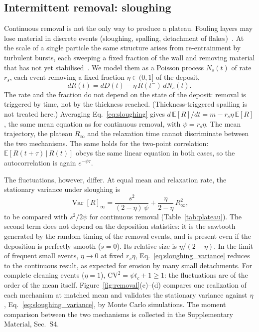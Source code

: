 \documentclass[preprint,12pt]{elsarticle}
\begin{document}
\subsection{Intermittent removal: sloughing}
\label{sec:removal_sloughing}

Continuous removal is not the only way to produce a plateau. Fouling layers
may lose material in discrete events (sloughing, spalling, detachment of
flakes)~\cite{Stewart1993,Bohn2007}. At the scale of a single particle the same
structure arises from re-entrainment by turbulent bursts, each sweeping a fixed
fraction of the wall and removing material that has not yet
stabilised~\cite{Vatistas1988}. We model them as a Poisson process $N_s(t)$ of rate $r_s$, each event
removing a fixed fraction $\eta\in(0,1]$ of the deposit,
\begin{equation}
  dR(t)=dD(t)-\eta\,R(t^-)\,dN_s(t).
  \label{eq:sloughing}
\end{equation}
The rate and the fraction do not depend on the state of the deposit: removal is
triggered by time, not by the thickness reached. (Thickness-triggered spalling
is not treated here.) Averaging Eq.~\eqref{eq:sloughing} gives
$d\,\mathbb E[R]/dt=m-r_s\eta\,\mathbb E[R]$, the same mean equation as for
continuous removal, with $\psi=r_s\eta$. The mean trajectory, the plateau
$R_\infty$ and the relaxation time cannot discriminate between the two
mechanisms. The same holds for the two-point correlation: $\mathbb E[R(t+\tau)\,|\,R(t)]$ obeys the same linear
equation in both cases, so the autocorrelation is again $e^{-\psi\tau}$.

The fluctuations, however, differ. At equal mean and relaxation rate, the
stationary variance under sloughing is
\begin{equation}
  \operatorname{Var}[R]_\infty
  =\frac{s^2}{(2-\eta)\,\psi}+\frac{\eta}{2-\eta}\,R_\infty^2 ,
  \label{eq:sloughing_variance}
\end{equation}
to be compared with $s^2/2\psi$ for continuous removal
(Table~\ref{tab:plateau}). The second term does not depend on the deposition
statistics: it is the sawtooth generated by the random timing of the removal
events, and is present even if the deposition is perfectly smooth ($s=0$). Its
relative size is $\eta/(2-\eta)$. In the limit of frequent small events,
$\eta\to0$ at fixed $r_s\eta$, Eq.~\eqref{eq:sloughing_variance} reduces to
the continuous result, as expected for erosion by many small detachments. For
complete cleaning events ($\eta=1$), $\mathrm{CV}^2=\psi t_c+1\ge1$: the
fluctuations are of the order of the mean itself. Figure~\ref{fig:removal}(c)--(d)
compares one realization of each mechanism at matched mean and validates
the stationary variance against $\eta$, Eq.~\eqref{eq:sloughing_variance},
by Monte Carlo simulations. 
The moment comparison between the two mechanisms is collected in the Supplementary Material, Sec.~S4.
\end{document}

